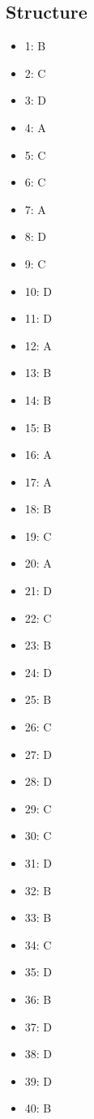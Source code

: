 \documentclass[12pt]{article}
\begin{document}
\subsection*{Structure}
\begin{itemize}[leftmargin=*]
\item 1: B
\item 2: C
\item 3: D
\item 4: A
\item 5: C
\item 6: C
\item 7: A
\item 8: D
\item 9: C
\item 10: D
\item 11: D
\item 12: A
\item 13: B
\item 14: B
\item 15: B
\item 16: A
\item 17: A
\item 18: B
\item 19: C
\item 20: A
\item 21: D
\item 22: C
\item 23: B
\item 24: D
\item 25: B
\item 26: C
\item 27: D
\item 28: D
\item 29: C
\item 30: C
\item 31: D
\item 32: B
\item 33: B
\item 34: C
\item 35: D
\item 36: B
\item 37: D
\item 38: D
\item 39: D
\item 40: B
\end{itemize}
\end{document}
